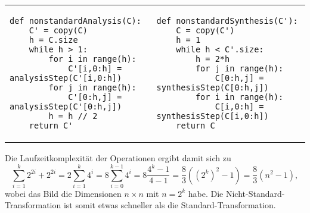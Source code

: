 \begin{adjustbox}{max width=\textwidth ,center}
\begin{tabular}{p{}|p{}}
\begin{verbatim}
def nonstandardAnalysis(C):
    C' = copy(C)
    h = C.size
    while h > 1:
        for i in range(h):
            C'[i,0:h] = analysisStep(C'[i,0:h])
        for j in range(h):
            C'[0:h,j] = analysisStep(C'[0:h,j])
        h = h // 2
    return C'
\end{verbatim}
&
\begin{verbatim}
def nonstandardSynthesis(C'):
    C = copy(C')
    h = 1
    while h < C'.size:
        h = 2*h
        for j in range(h):
            C[0:h,j] = synthesisStep(C[0:h,j])
        for i in range(h):
            C[i,0:h] = synthesisStep(C[i,0:h])
    return C
\end{verbatim}
\\
\end{tabular}
\end{adjustbox}

\noindent Die Laufzeitkomplexität der Operationen ergibt damit sich zu 
%
\[
\sum_{i=1}^k 2^{2i} + 2^{2i} 
= 2\sum_{i=1}^k 4^i 
= 8\sum_{i=0}^{k-1} 4^i 
= 8\frac{4^k-1}{4-1} 
= \frac{8}{3}((2^k)^2-1) 
= \frac{8}{3}(n^2-1) ,
\]
%
wobei das Bild die Dimensionen $n \times n$ mit $n=2^k$ habe. Die Nicht-Standard-Transformation ist somit etwas schneller als die Standard-Transformation.
%
